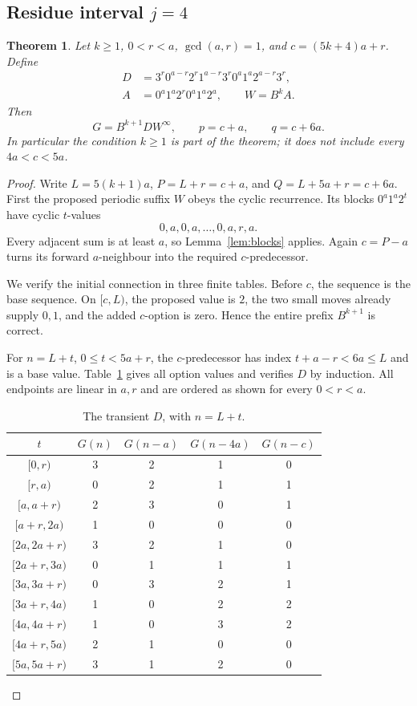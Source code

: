 \documentclass[11pt]{article}
\newtheorem{theorem}{Theorem}[section]
\theoremstyle{remark}\newtheorem{remark}[theorem]{Remark}
\newcommand{\per}{^{\infty}}
\newcommand{\half}[2]{[#1,#2)}
\begin{document}
\subsection{Residue interval \texorpdfstring{$j=4$}{j=4}}
\begin{theorem}\label{thm:fourth}
Let $k\ge1$, $0<r<a$, $\gcd(a,r)=1$, and $c=(5k+4)a+r$. Define
\begin{align*}
 D&=3^r0^{a-r}2^r1^{a-r}3^r0^a1^a2^{a-r}3^r,\\
 A&=0^a1^a2^r0^a1^a2^a,\qquad W=B^kA.
\end{align*}
Then
\[G=B^{k+1}D W\per,\qquad p=c+a,\qquad q=c+6a.\]
In particular the condition $k\ge1$ is part of the theorem; it does not include every $4a<c<5a$.
\end{theorem}
\begin{proof}
Write $L=5(k+1)a$, $P=L+r=c+a$, and $Q=L+5a+r=c+6a$. First the proposed periodic suffix $W$ obeys the cyclic recurrence. Its blocks $0^a1^a2^t$ have cyclic $t$-values
\[0,a,0,a,\ldots,0,a,r,a.\]
Every adjacent sum is at least $a$, so Lemma~\ref{lem:blocks} applies. Again $c=P-a$ turns its forward $a$-neighbour into the required $c$-predecessor.

We verify the initial connection in three finite tables. Before $c$, the sequence is the base sequence. On $\half cL$, the proposed value is $2$, the two small moves already supply $0,1$, and the added $c$-option is zero. Hence the entire prefix $B^{k+1}$ is correct.

For $n=L+t$, $0\le t<5a+r$, the $c$-predecessor has index $t+a-r<6a\le L$ and is a base value. Table~\ref{tab:D} gives all option values and verifies $D$ by induction. All endpoints are linear in $a,r$ and are ordered as shown for every $0<r<a$.
\begin{table}[ht]\centering\small
\begin{tabular}{c|c|ccc}\toprule
$t$ & $G(n)$ & $G(n-a)$ & $G(n-4a)$ & $G(n-c)$\\\midrule
$[0,r)$&3&2&1&0\\
$[r,a)$&0&2&1&1\\
$[a,a+r)$&2&3&0&1\\
$[a+r,2a)$&1&0&0&0\\
$[2a,2a+r)$&3&2&1&0\\
$[2a+r,3a)$&0&1&1&1\\
$[3a,3a+r)$&0&3&2&1\\
$[3a+r,4a)$&1&0&2&2\\
$[4a,4a+r)$&1&0&3&2\\
$[4a+r,5a)$&2&1&0&0\\
$[5a,5a+r)$&3&1&2&0\\\bottomrule
\end{tabular}
\caption{The transient $D$, with $n=L+t$.}\label{tab:D}
\end{table}


\end{proof}
\end{document}
